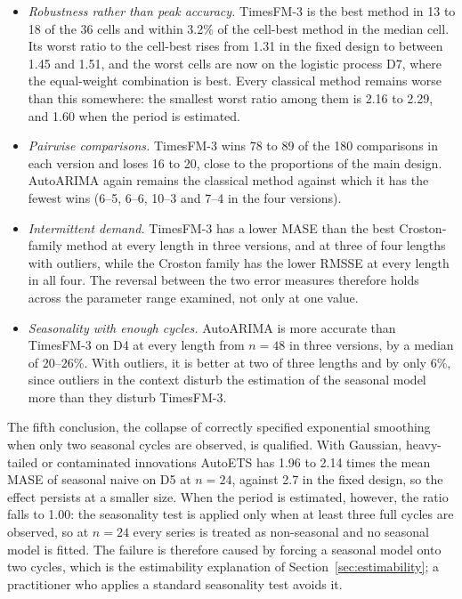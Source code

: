 \documentclass[11pt]{article}
\providecommand{\sectionref}[1]{Section~\ref{#1}}
\begin{document}
\begin{itemize}
\item \emph{Robustness rather than peak accuracy.} TimesFM-3 is the best method in 13 to 18 of the
      36 cells and within 3.2\% of the cell-best method in the median cell. Its worst ratio to the
      cell-best rises from 1.31 in the fixed design to between 1.45 and 1.51, and the worst cells
      are now on the logistic process D7, where the equal-weight combination is best. Every
      classical method remains worse than this somewhere: the smallest worst ratio among them is
      2.16 to 2.29, and 1.60 when the period is estimated.
\item \emph{Pairwise comparisons.} TimesFM-3 wins 78 to 89 of the 180 comparisons in each version
      and loses 16 to 20, close to the proportions of the main design. AutoARIMA again remains
      the classical method against which it has the fewest wins (6--5, 6--6, 10--3 and 7--4 in
      the four versions).
\item \emph{Intermittent demand.} TimesFM-3 has a lower MASE than the best Croston-family method
      at every length in three versions, and at three of four lengths with outliers, while the
      Croston family has the lower RMSSE at every length in all four. The reversal between the two
      error measures therefore holds across the parameter range examined, not only at one value.
\item \emph{Seasonality with enough cycles.} AutoARIMA is more accurate than TimesFM-3 on D4 at
      every length from $n = 48$ in three versions, by a median of 20--26\%. With outliers, it is
      better at two of three lengths and by only 6\%, since outliers in the context disturb the
      estimation of the seasonal model more than they disturb TimesFM-3.
\end{itemize}

The fifth conclusion, the collapse of correctly specified exponential smoothing when only two
seasonal cycles are observed, is qualified. With Gaussian, heavy-tailed or contaminated innovations AutoETS has 1.96 to 2.14 times
the mean MASE of seasonal naive on D5 at $n = 24$, against 2.7 in the fixed design, so the effect
persists at a smaller size. When the period is estimated, however, the ratio falls to 1.00: the
seasonality test is applied only when at least three full cycles are observed, so at
$n = 24$ every series is treated as
non-seasonal and no seasonal model is fitted. The failure is therefore caused by forcing a
seasonal model onto two cycles, which is the estimability explanation of
\sectionref{sec:estimability}; a practitioner who applies a standard seasonality test avoids it.
\end{document}
